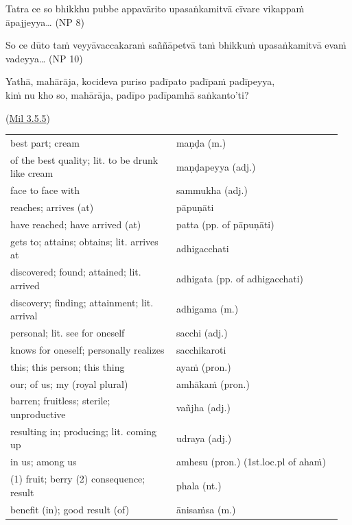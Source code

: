 \documentclass[11pt,oneside]{memoir}
\begin{document}
\bigskip

Tatra ce so bhikkhu pubbe appavārito upasaṅkamitvā cīvare vikappaṁ āpajjeyya\ldots{} (NP 8)

\bigskip

So ce dūto taṁ veyyāvaccakaraṁ saññāpetvā taṁ bhikkuṁ upasaṅkamitvā evaṁ vadeyya\ldots{} (NP 10)

\bigskip

Yathā, mahārāja, kocideva puriso padīpato padīpaṁ padīpeyya, \\
kiṁ nu kho so, mahārāja, padīpo padīpamhā saṅkanto'ti?

(\href{https://suttacentral.net/mil3.5.5/pli/ms}{Mil 3.5.5})

\clearpage

\begin{longtable}{L{0.48\linewidth} L{0.48\linewidth}}
best part; cream & maṇḍa (m.)\\
of the best quality; lit. to be drunk like cream & maṇḍapeyya (adj.)\\
face to face with & sammukha (adj.)\\
reaches; arrives (at) & pāpuṇāti\\
have reached; have arrived (at) & patta (pp. of pāpuṇāti)\\
gets to; attains; obtains; lit. arrives at & adhigacchati\\
discovered; found; attained; lit. arrived & adhigata (pp. of adhigacchati)\\
discovery; finding; attainment; lit. arrival & adhigama (m.)\\
personal; lit. see for oneself & sacchi (adj.)\\
knows for oneself; personally realizes & sacchikaroti\\
this; this person; this thing & ayaṁ (pron.)\\
our; of us; my (royal plural) & amhākaṁ (pron.)\\
barren; fruitless; sterile; unproductive & vañjha (adj.)\\
resulting in; producing; lit. coming up & udraya (adj.)\\
in us; among us & amhesu (pron.) (1st.loc.pl of ahaṁ)\\
(1) fruit; berry (2) consequence; result & phala (nt.)\\
benefit (in); good result (of) & ānisaṁsa (m.)\\
\end{longtable}
\end{document}
